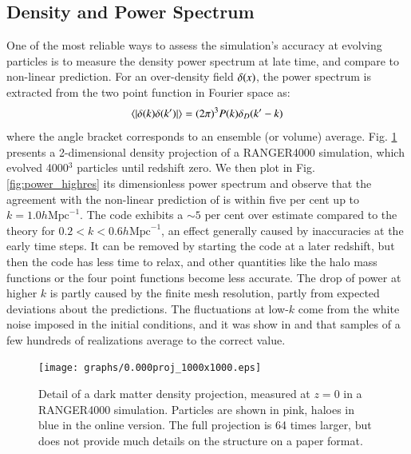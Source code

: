 \documentclass[useAMS,usenatbib]{mn2e}
\begin{document}
 
 \subsection{Density and Power Spectrum}
 \label{subsec:powerspectrum}
 
One of the most reliable ways to assess the simulation's accuracy at evolving particles
is to measure the density power spectrum at late time, and compare to non-linear prediction. 
For an over-density field $\delta({\bf \it x})$, the power spectrum is extracted from the two point function in Fourier space as:
\begin{eqnarray}
\langle | \delta ({\bf \it k}) \delta ({\bf \it k'}) | \rangle = (2\pi)^{3}P(k)\delta_{D}({\bf \it k'} - {\bf \it k})
\label{eq:power}
\end{eqnarray}
where the angle bracket corresponds to an ensemble (or volume) average.
Fig. \ref{fig:density} presents  a 2-dimensional density projection of a RANGER4000 simulation, which evolved 4000$^3$ particles until redshift zero.
We then plot in Fig. \ref{fig:power_highres}  its dimensionless power spectrum  and
observe that the agreement with the non-linear prediction of \citet{2003MNRAS.341.1311S} is within five per cent up to $k = 1.0 h \mbox{Mpc}^{-1}$.
The code exhibits  a $\sim 5$ per cent over estimate compared 
  to the theory for $ 0.2 < k < 0.6 h\mbox{Mpc}^{-1}$, an effect generally caused by inaccuracies at the early time steps. It can be removed by starting the code at a later redshift,
  but then the code has less time to relax, and other quantities like the halo mass functions or the four point functions become less accurate.
The drop of power at higher $k$ is partly caused by the finite mesh resolution, partly from expected deviations about the predictions.
The fluctuations at low-$k$ come from the white noise imposed in the initial conditions, and it was show in \citet{2012MNRAS.419.2949N} and 
\citet{2012MNRAS.423.2288H} that
samples of a few hundreds of realizations average to the correct value. 

\begin{figure}%
  \begin{center}
\texttt{[image: graphs/0.000proj\_1000x1000.eps]}
  \caption{Detail of a dark matter density projection, measured at $z=0$ in a RANGER4000 simulation.
  Particles are shown in pink, haloes in blue in the online version. The full projection is 64 times larger,
  but does not provide much details on the structure on a paper format.
    \label{fig:density}}
\end{center}
\end{figure}
\end{document}
